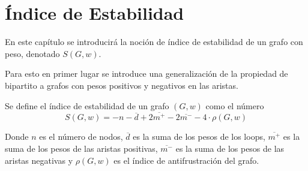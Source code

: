 \chapter{Índice de Estabilidad}

En este capítulo se introducirá la noción de índice de estabilidad de un grafo con peso, denotado $S(G,w)$.

Para esto en primer lugar se introduce una generalización de la propiedad de bipartito a grafos con pesos positivos y negativos
en las aristas.

\begin{defn}
    
\end{defn}

Se define el índice de estabilidad de un grafo $(G,w)$ como el número
\begin{equation*}
    S(G,w) = -n - \overline{d} + 2\overline{m^+} - 2\overline{m^-} -4\cdot \rho(G,w)
\end{equation*}

Donde $n$ es el número de nodos, $\overline{d}$ es la suma de los pesos de los loops, $\overline{m^+}$ es la suma de los pesos
de las aristas positivas, $\overline{m^-}$ es la suma de los pesos de las aristas negativas y $\rho(G,w)$ es el índice de 
antifrustración del grafo.